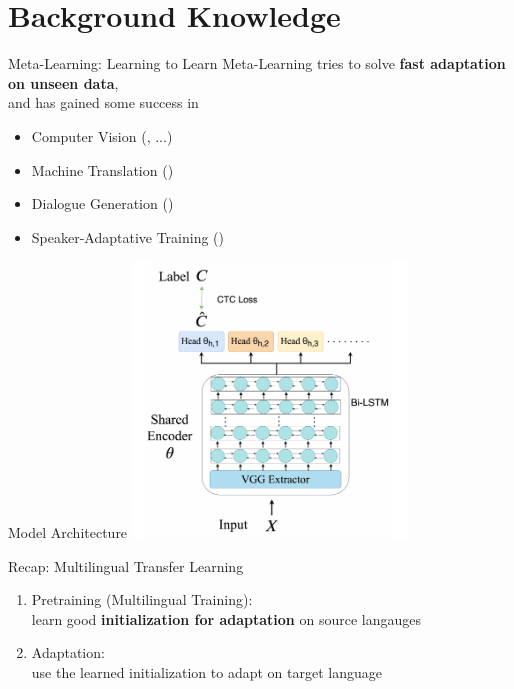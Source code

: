 \documentclass{beamer}
\begin{document}



\section{Background Knowledge}
\begin{frame}[t]{Meta-Learning: Learning to Learn}
  Meta-Learning tries to solve \textbf{fast adaptation on unseen data}, \\
  and has gained some success in
  \begin{itemize}
    \item Computer Vision (\citealt{snell2017prototypical}, \citealt{rusu2018meta} ...)
    \item Machine Translation (\citealt{gu2018meta})
    \item Dialogue Generation (\citealt{mi2019meta})
    \item Speaker-Adaptative Training (\citealt{klejch2019speaker})
  \end{itemize}
\end{frame}

\begin{frame}[t]{Model Architecture}
  \center \includegraphics[width=0.55\textwidth]{fig/model_arch.png}
\end{frame}


\begin{frame}[t]{Recap: Multilingual Transfer Learning}

  \begin{enumerate}
    \item Pretraining (Multilingual Training): \\ learn good \textbf{initialization for adaptation} on source langauges
    \item Adaptation: \\ use the learned initialization to adapt on target language
  \end{enumerate}
\end{frame}
\end{document}
